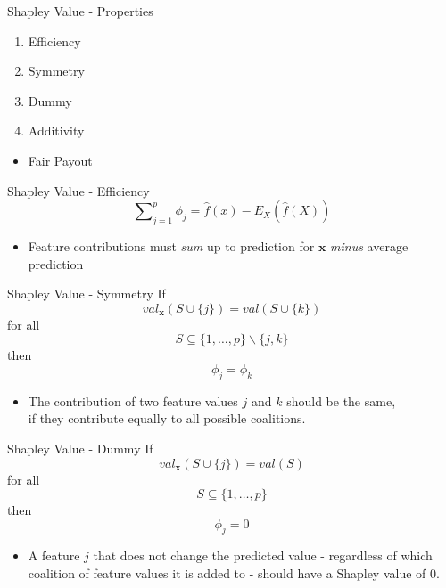 \begin{frame}{Shapley Value - Properties}
	\begin{enumerate}
		\item Efficiency
		\item Symmetry
		\item Dummy
		\item Additivity
	\end{enumerate}
	\begin{itemize}
		\item Fair Payout
	\end{itemize}
\end{frame}
\begin{frame}{Shapley Value - Efficiency}
	\begin{equation}
		\sum\nolimits_{j=1}^p\phi_j=\hat{f}(x)-E_X(\hat{f}(X))
	\end{equation}
	\begin{itemize}
		\item Feature contributions must \emph{sum} up to prediction for $\bm{x}$ \emph{minus} average prediction
	\end{itemize}
\end{frame}
\begin{frame}{Shapley Value - Symmetry}
	If
	\begin{equation}
		val_{\bm{x}}(S \cup \{j\})=val(S\cup\{k\})
	\end{equation}
	for all
	\begin{equation*}
		S\subseteq\{1,\ldots, p\} \backslash \{j,k\}
	\end{equation*}
	then
	\begin{equation*}
		\phi_j=\phi_k
	\end{equation*}
	\begin{itemize}
		\item The contribution of two feature values $j$ and $k$ should be the same, 
		\\if they contribute equally to all possible coalitions.
	\end{itemize}
\end{frame}
\begin{frame}{Shapley Value - Dummy}
	If
	\begin{equation}
		val_{\bm{x}}(S\cup\{j\})=val(S)
	\end{equation}
	for all
	\begin{equation*}
		S\subseteq\{1,\ldots,p\}
	\end{equation*}
	then
	\begin{equation*}
		\phi_j=0
	\end{equation*}
	\begin{itemize}
		\item A feature $j$ that does not change the predicted value - regardless of which coalition of feature values it is added to - should have a Shapley value of 0.
	\end{itemize}
\end{frame}
